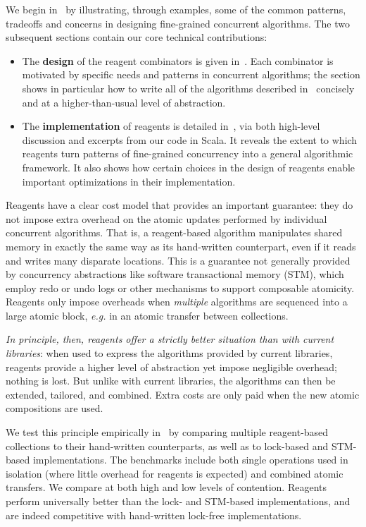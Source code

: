 \documentclass[preprint,nocopyrightspace]{sigplanconf}
\begin{document}
\vskip 6pt
\noindent
We begin in~ by illustrating, through examples, some of the
common patterns, tradeoffs and concerns in designing fine-grained concurrent
algorithms.  The two subsequent sections contain our core technical
contributions:
\begin{itemize}
\item The \textbf{design} of the reagent combinators is given
  in~.  Each combinator is motivated by specific needs and
  patterns in concurrent algorithms; the section shows in
  particular how to write all of the algorithms described in~
  concisely and at a higher-than-usual level of abstraction.
\item The \textbf{implementation} of reagents is detailed
  in~, via both high-level discussion and excerpts from
  our code in Scala.  It reveals the extent to which reagents turn patterns of
  fine-grained concurrency into a general algorithmic framework.  It also shows
  how certain choices in the design of reagents enable important optimizations
  in their implementation.
\end{itemize}
Reagents have a clear cost model that provides an important guarantee: they do
not impose extra overhead on the atomic updates performed by individual
concurrent algorithms.  That is, a reagent-based algorithm manipulates shared
memory in exactly the same way as its hand-written counterpart, even if it reads
and writes many disparate locations.  This is a guarantee not generally provided
by concurrency abstractions like software transactional memory (STM), which
employ redo or undo logs or other mechanisms to support composable atomicity.
Reagents only impose overheads when \emph{multiple} algorithms are sequenced
into a large atomic block, \emph{e.g.}  in an atomic transfer between
collections.

\emph{In principle, then, reagents offer a strictly better situation than with
  current libraries}: when used to express the algorithms provided by current
libraries, reagents provide a higher level of abstraction yet impose negligible
overhead; nothing is lost.  But unlike with current libraries, the algorithms
can then be extended, tailored, and combined.  Extra costs are only paid when
the new atomic compositions are used.  

We test this principle empirically in~ by comparing multiple
reagent-based collections to their hand-written counterparts, as well as to
lock-based and STM-based implementations.  The benchmarks include both single
operations used in isolation (where little overhead for reagents is expected)
and combined atomic transfers.  We compare at both high and low levels of
contention.  Reagents perform universally better than the lock- and STM-based
implementations, and are indeed competitive with hand-written lock-free
implementations.
\end{document}
